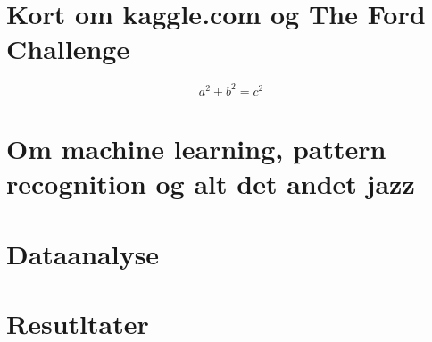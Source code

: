\section{Kort om kaggle.com og The Ford Challenge}
\begin{equation}
    a^2 + b^2 = c^2
\end{equation}

\pagebreak

\section{Om machine learning, pattern recognition og alt det andet jazz}

\section{Dataanalyse}

\section{Resutltater}